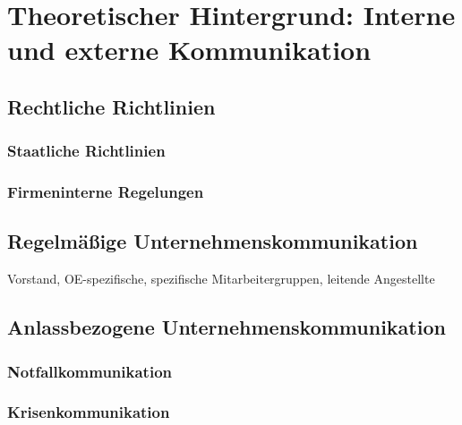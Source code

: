 \section{Theoretischer Hintergrund: Interne und externe Kommunikation}
\label{sec:theoretischer_hintergrund}

\subsection{Rechtliche Richtlinien}
\label{subsec:rechtliche_richtlinien}

\subsubsection{Staatliche Richtlinien}
\subsubsection{Firmeninterne Regelungen}

\subsection{Regelmäßige Unternehmenskommunikation}

Vorstand, OE-spezifische, spezifische Mitarbeitergruppen, leitende Angestellte
\subsection{Anlassbezogene Unternehmenskommunikation}
\subsubsection{Notfallkommunikation}
\subsubsection{Krisenkommunikation}


